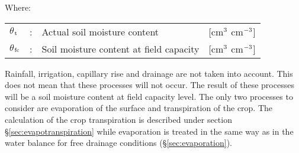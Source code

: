 Where:\\[5pt]
\begin{tabularx}{\textwidth}{llXr}
	$\theta$$_{{\rm t}}$ &:& Actual soil moisture content & [cm$^{{\rm 3}}$ cm$^{{\rm -3}}$]\\
	$\theta$$_{{\rm fc}}$ &:& Soil moisture content at field capacity & [cm$^{{\rm 3}}$ cm$^{{\rm -3}}$]\\
\end{tabularx}

Rainfall, irrigation, capillary rise and drainage are not taken into account. This does not
mean that these processes will not occur. The result of these processes will be a soil
moisture content at field capacity level. The only two processes to consider are evaporation of 
the surface and transpiration of the crop. The calculation of the crop transpiration is described
under section  \S \ref{sec:evapotranspiration} while evaporation is treated in the same
way as in the water balance for free drainage conditions (\S \ref{sec:evaporation}).

